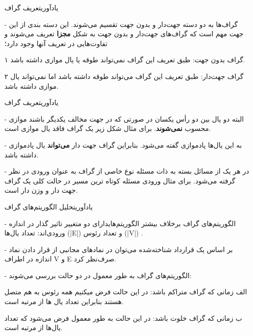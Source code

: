 \begin{itemframe}{یادآوری}{تعریف گراف}
\item[-]
گراف‌ها به دو دسته جهت‌دار و بدون جهت تقسیم می‌شوند. این دسته بندی از این جهت مهم است که گراف‌های جهت‌دار و بدون جهت به شکل \textbf{مجزا} تعریف می‌شوند و تفاوت‌هایی در تعریف آنها وجود دارد؛
\item[۱]
گراف بدون جهت: طبق تعریف این گراف نمی‌تواند طوقه یا یال موازی داشته باشد.
\item[۲]
گراف جهت‌دار: طبق تعریف این گراف می‌تواند طوقه داشته باشد اما نمی‌تواند یال موازی داشته باشد.

\end{itemframe}
\begin{itemframe}{یادآوری}{تعریف گراف}
\item[-]
البته دو یال بین دو رأس یکسان در صورتی که در جهت مخالف یکدیگر باشند موازی محسوب \textbf{نمی‌شوند}. برای مثال شکل زیر یک گراف فاقد یال موازی است.
\item[-]
 به این یال‌ها پادموازی
 گفته می‌شود. بنابراین گراف جهت دار \textbf{می‌تواند} یال پادموازی داشته باشد.

\item[-]
در هر یک از مسائل بسته به ذات مسئله نوع خاصی از گراف به عنوان ورودی در نظر گرفته می‌شود. برای مثال ورودی مسئله کوتاه ترین مسیر در حالت کلی یک گراف جهت دار و وزن دار است.
\end{itemframe}

\begin{itemframe}{یادآوری}{تحلیل الگوریتم‌های گراف}
\item[-]
الگوریتم‌های گراف برخلاف بیشتر الگوریتم‌هایدارای دو متغییر تاثیر گذار در اندازه ورودی‌اند: تعداد یال‌ها (|E|) و تعداد رئوس (|V|) .
\item[-]
بر اساس یک قرارداد شناخته‌شده می‌توان در نمادهای مجانبی از قرار دادن نماد اندازه در اطراف V و E صرف‌نظر ‌کرد.

\item[-]
الگوریتم‌های گراف به طور معمول در دو حالت بررسی می‌شوند:
\item[الف]
زمانی که گراف متراکم باشد: در این حالت فرض میکنیم همه رئوس به هم متصل هستند بنابراین تعداد یال ها از مرتبه
است.
\item[ب]
زمانی که گراف خلوت باشد:‌ در این حالت به طور معمول فرض می‌شود که تعداد یال‌ها از مرتبه
است.
\end{itemframe}

